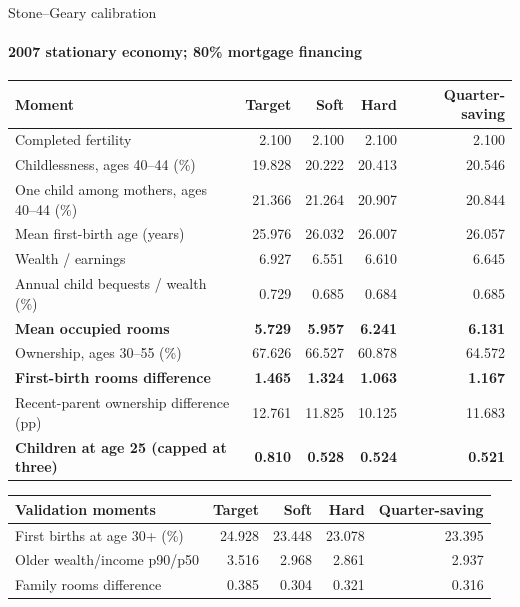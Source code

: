 \documentclass[11pt,aspectratio=169]{beamer}
\begin{document}
\begin{frame}{Stone--Geary calibration}
\framesubtitle{2007 stationary economy; 80\% mortgage financing}
\centering
\fontsize{8.4}{9.2}\selectfont
{\centering\renewcommand{\arraystretch}{0.92}\setlength{\tabcolsep}{4pt}
\begin{tabular*}{0.98\textwidth}{@{}p{}@{\extracolsep{\fill}}rrrr@{}}
\toprule
Moment & Target & Soft & Hard & Quarter-saving \\
\midrule
Completed fertility & 2.100 & 2.100 & 2.100 & 2.100 \\
Childlessness, ages 40--44 (\%) & 19.828 & 20.222 & 20.413 & 20.546 \\
One child among mothers, ages 40--44 (\%) & 21.366 & 21.264 & 20.907 & 20.844 \\
Mean first-birth age (years) & 25.976 & 26.032 & 26.007 & 26.057 \\
Wealth / earnings & 6.927 & 6.551 & 6.610 & 6.645 \\
Annual child bequests / wealth (\%) & 0.729 & 0.685 & 0.684 & 0.685 \\
\textbf{Mean occupied rooms} & \textbf{5.729} & \textbf{5.957} & \textbf{6.241} & \textbf{6.131} \\
Ownership, ages 30--55 (\%) & 67.626 & 66.527 & 60.878 & 64.572 \\
\textbf{First-birth rooms difference} & \textbf{1.465} & \textbf{1.324} & \textbf{1.063} & \textbf{1.167} \\
Recent-parent ownership difference (pp) & 12.761 & 11.825 & 10.125 & 11.683 \\
\textbf{Children at age 25 (capped at three)} & \textbf{0.810} & \textbf{0.528} & \textbf{0.524} & \textbf{0.521} \\
\bottomrule
\end{tabular*}
\par\vspace{0.45em}
\begin{tabular*}{0.98\textwidth}{@{}p{}@{\extracolsep{\fill}}rrrr@{}}
\toprule
Validation moments & Target & Soft & Hard & Quarter-saving \\
\midrule
First births at age 30+ (\%) & 24.928 & 23.448 & 23.078 & 23.395 \\
Older wealth/income p90/p50 & 3.516 & 2.968 & 2.861 & 2.937 \\
Family rooms difference & 0.385 & 0.304 & 0.321 & 0.316 \\
\bottomrule
\end{tabular*}
\par}
\end{frame}
\end{document}
